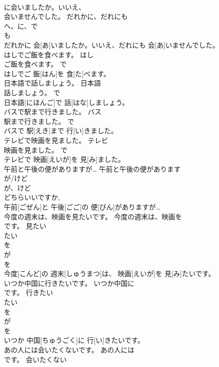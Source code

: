 \documentclass[8pt]{extreport}
\begin{document}
\begin{CJK}{UTF8}{min}
\\	に会いましたか。いいえ、
\\	会いませんでした。	だれかに、だれにも	
\\	へ、に、で 
\\	も 
\\	だれかに 会[あ]いましたか。いいえ、だれにも 会[あ]いませんでした。	
\\	はしでご飯を食べます。	はし
\\	ご飯を食べます。	で	
\\	はしでご 飯[はん]を 食[た]べます。	
\\	日本語で話しましょう。	日本語
\\	話しましょう。	で	
\\	日本語[にほんご]で 話[はな]しましょう。	
\\	バスで駅まで行きました。	バス
\\	駅まで行きました。	で	
\\	バスで 駅[えき]まで 行[い]きました。	
\\	テレビで映画を見ました。	テレビ
\\	映画を見ました。	で	
\\	テレビで 映画[えいが]を 見[み]ました。	
\\	午前と午後の便がありますが…	午前と午後の便があります
\\	が/けど	
\\	が、けど 
\\	どちらいいですか, 
\\	午前[ごぜん]と 午後[ごご]の 便[びん]がありますが…	
\\	今度の週末は、映画を見たいです。	今度の週末は、映画を
\\	です。	見たい	
\\	たい 
\\	を 
\\	が 
\\	を 
\\	今度[こんど]の 週末[しゅうまつ]は、 映画[えいが]を 見[み]たいです。	
\\	いつか中国に行きたいです。	いつか中国に
\\	です。	行きたい	
\\	たい 
\\	を 
\\	が 
\\	を 
\\	いつか 中国[ちゅうごく]に 行[い]きたいです。	
\\	あの人には会いたくないです。	あの人には
\\	です。	会いたくない	

\end{CJK}
\end{document}

